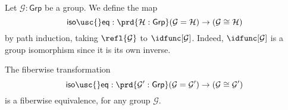 \begin{defn}
Let $\mathcal{G}:\mathsf{Grp}$ be a group. We define the map
\begin{equation*}
\mathsf{iso\usc{}eq} : \prd{\mathcal{H}:\mathsf{Grp}}(\mathcal{G}=\mathcal{H})\to (\mathcal{G}\cong\mathcal{H})
\end{equation*}
by path induction, taking $\refl{\mathcal{G}}$ to $\idfunc[\mathcal{G}]$. Indeed, $\idfunc[\mathcal{G}]$ is a group isomorphism since it is its own inverse.
\end{defn}

\begin{thm}
The fiberwise transformation
\begin{equation*}
\mathsf{iso\usc{}eq} : \prd{\mathcal{G}':\mathsf{Grp}}(\mathcal{G}=\mathcal{G}')\to (\mathcal{G}\cong\mathcal{G}')
\end{equation*}
is a fiberwise equivalence, for any group $\mathcal{G}$.
\end{thm}

